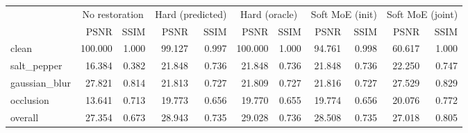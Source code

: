 \begin{tabular}{lrrrrrrrrrr}
\toprule
 & \multicolumn{2}{c}{No restoration} & \multicolumn{2}{c}{Hard (predicted)} & \multicolumn{2}{c}{Hard (oracle)} & \multicolumn{2}{c}{Soft MoE (init)} & \multicolumn{2}{c}{Soft MoE (joint)} \\
 & PSNR & SSIM & PSNR & SSIM & PSNR & SSIM & PSNR & SSIM & PSNR & SSIM \\
\midrule
clean & 100.000 & 1.000 & 99.127 & 0.997 & 100.000 & 1.000 & 94.761 & 0.998 & 60.617 & 1.000 \\
salt_pepper & 16.384 & 0.382 & 21.848 & 0.736 & 21.848 & 0.736 & 21.848 & 0.736 & 22.250 & 0.747 \\
gaussian_blur & 27.821 & 0.814 & 21.813 & 0.727 & 21.809 & 0.727 & 21.816 & 0.727 & 27.529 & 0.829 \\
occlusion & 13.641 & 0.713 & 19.773 & 0.656 & 19.770 & 0.655 & 19.774 & 0.656 & 20.076 & 0.772 \\
overall & 27.354 & 0.673 & 28.943 & 0.735 & 29.028 & 0.736 & 28.508 & 0.735 & 27.018 & 0.805 \\
\bottomrule
\end{tabular}
